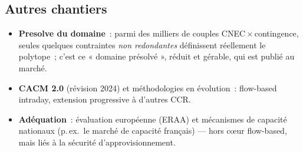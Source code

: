 \documentclass[11pt,a4paper]{article}
\begin{document}
\subsection{Autres chantiers}
\label{sec:chantiers}

\begin{itemize}[nosep,leftmargin=1.4em]
  \item \textbf{Presolve du domaine}~: parmi des milliers de couples
        CNEC\,$\times$\,contingence, seules quelques contraintes \emph{non
        redondantes} définissent réellement le polytope~; c'est ce
        « domaine présolvé », réduit et gérable, qui est publié au marché.
  \item \textbf{CACM 2.0} (révision 2024) et méthodologies en évolution~:
        flow-based intraday, extension progressive à d'autres CCR.
  \item \textbf{Adéquation}~: évaluation européenne (ERAA) et mécanismes de
        capacité nationaux (p.\,ex.\ le marché de capacité français) — hors
        cœur flow-based, mais liés à la sécurité d'approvisionnement.
\end{itemize}
\end{document}
